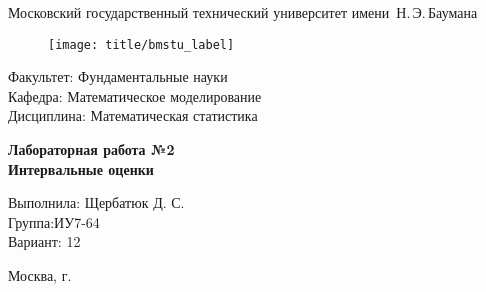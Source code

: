 
\thispagestyle{empty}

\begin{center}
    \Large
    Московский государственный технический университет имени~Н.\,Э.\,Баумана
\end{center}

\begin{figure}[h!]
    \begin{center}
        \texttt{[image: title/bmstu\_label]}
    \end{center}
\end{figure}

\hfill\begin{minipage}{0.77\textwidth}
{\large
\noindent
Факультет: Фундаментальные науки\\[2mm]
\noindent
Кафедра:  Математическое моделирование\\[2mm]
\noindent
Дисциплина: Математическая статистика 
\vspace{1.5cm}}
\end{minipage}
\vfill

\begin{center}
    \Large
    \textbf{Лабораторная работа №2 \\}
    \textbf{Интервальные оценки} \\
\end{center}
\vfill

\hfill\begin{minipage}{0.35\textwidth}
	Выполнила: Щербатюк Д. С.\\
	Группа:ИУ7-64 \\
	Вариант: 12
\end{minipage}
\vfill

\begin{center}
    Москва, \the\year\space г.
\end{center}